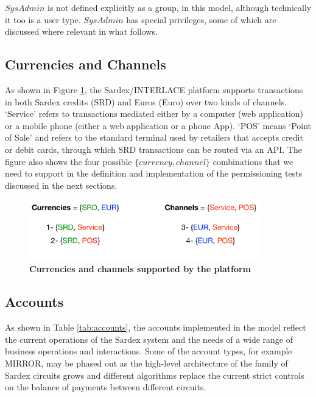 $SysAdmin$ is not defined explicitly as a group, in this model, although technically it too is a user type. $SysAdmin$ has special privileges, some of which are discussed where relevant in what follows.

\subsection{Currencies and Channels}
As shown in Figure \ref{fig:currchan}, the Sardex/INTERLACE platform supports transactions in both Sardex credits (SRD) and Euros (Euro) over two kinds of channels. `Service' refers to transactions mediated either by a computer (web application) or a mobile phone (either a web application or a phone App). `POS' means `Point of Sale' and refers to the standard terminal used by retailers that accepts credit or debit cards, through which SRD transactions can be routed via an API. The figure also shows the four possible $\{ currency, channel \}$ combinations that we need to support in the definition and implementation of the permissioning tests discussed in the next sections.

\vspace{-0.3cm}
\begin{figure}[h]
\centering
\includegraphics[width=10cm]{Figures/Curr_Chan}
\caption{\small\textbf{Currencies and channels supported by the platform}}
\label{fig:currchan}
\end{figure}

\subsection{Accounts}
As shown in Table \ref{tab:accounts}, the accounts implemented in the model reflect the current operations of the Sardex system and the needs of a wide range of business operations and interactions. Some of the account types, for example MIRROR, may be phased out as the high-level architecture of the family of Sardex circuits grows and different algorithms replace the current strict controls on the balance of payments between different circuits.

